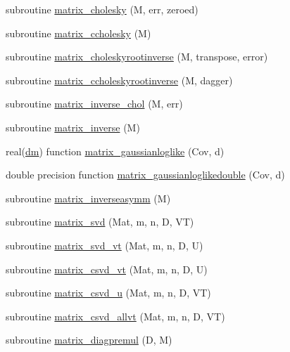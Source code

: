 \begin{DoxyCompactItemize}
\item 
subroutine \mbox{\hyperlink{namespacematrixutils_a380ecdd4310ae2f91be911a45516df12}{matrix\+\_\+cholesky}} (M, err, zeroed)
\item 
subroutine \mbox{\hyperlink{namespacematrixutils_ad7a37503ef0aeeef3585caccc253c428}{matrix\+\_\+ccholesky}} (M)
\item 
subroutine \mbox{\hyperlink{namespacematrixutils_acda49677dcf7603b255acba37dda9b92}{matrix\+\_\+choleskyrootinverse}} (M, transpose, error)
\item 
subroutine \mbox{\hyperlink{namespacematrixutils_a3d8668e32abacfbeeeaaca90c120a129}{matrix\+\_\+ccholeskyrootinverse}} (M, dagger)
\item 
subroutine \mbox{\hyperlink{namespacematrixutils_a663d1886940de1ea811bab15859db116}{matrix\+\_\+inverse\+\_\+chol}} (M, err)
\item 
subroutine \mbox{\hyperlink{namespacematrixutils_aac7ea35062daeadd8fb4ebc86cb42e7a}{matrix\+\_\+inverse}} (M)
\item 
real(\mbox{\hyperlink{namespacematrixutils_a7bdc564986ea4d90f51201c75606ef3d}{dm}}) function \mbox{\hyperlink{namespacematrixutils_a5a3ede7fff09728b5cacb5a559ab936f}{matrix\+\_\+gaussianloglike}} (Cov, d)
\item 
double precision function \mbox{\hyperlink{namespacematrixutils_ab48ad701f7ef749e5bea654c83ac4544}{matrix\+\_\+gaussianloglikedouble}} (Cov, d)
\item 
subroutine \mbox{\hyperlink{namespacematrixutils_af319573ea9284b8ab1e745f9610b36f6}{matrix\+\_\+inverseasymm}} (M)
\item 
subroutine \mbox{\hyperlink{namespacematrixutils_a7960d8813f71cc715ba85ffba471dd38}{matrix\+\_\+svd}} (Mat, m, n, D, VT)
\item 
subroutine \mbox{\hyperlink{namespacematrixutils_a295b572473f10f878fb8d3fc7b8d06f1}{matrix\+\_\+svd\+\_\+vt}} (Mat, m, n, D, U)
\item 
subroutine \mbox{\hyperlink{namespacematrixutils_a536eb03269736dd2f4c33b0978211583}{matrix\+\_\+csvd\+\_\+vt}} (Mat, m, n, D, U)
\item 
subroutine \mbox{\hyperlink{namespacematrixutils_af38c4627b0e939eadba68b6ea264297b}{matrix\+\_\+csvd\+\_\+u}} (Mat, m, n, D, VT)
\item 
subroutine \mbox{\hyperlink{namespacematrixutils_aaca4350f2cff361fd0233962eba5fdc7}{matrix\+\_\+csvd\+\_\+allvt}} (Mat, m, n, D, VT)
\item 
subroutine \mbox{\hyperlink{namespacematrixutils_ac24fa96b1159f9748d7f0ea3fbdc1199}{matrix\+\_\+diagpremul}} (D, M)

\end{DoxyCompactItemize}
